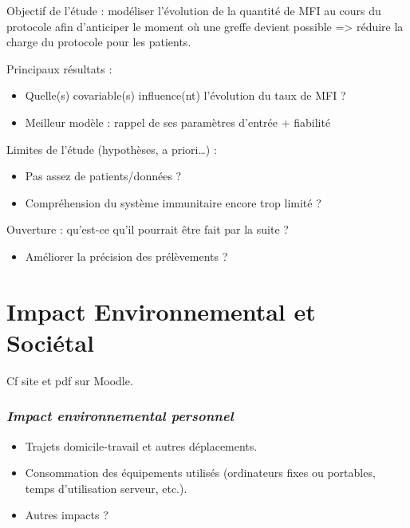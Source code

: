 \documentclass[
]{article}
\providecommand{\tightlist}{%
  \setlength{\itemsep}{0pt}\setlength{\parskip}{0pt}}
\begin{document}
Objectif de l'étude : modéliser l'évolution de la quantité de MFI au
cours du protocole afin d'anticiper le moment où une greffe devient
possible =\textgreater{} réduire la charge du protocole pour les
patients.

Principaux résultats :

\begin{itemize}
\tightlist
\item
  Quelle(s) covariable(s) influence(nt) l'évolution du taux de MFI ?
\item
  Meilleur modèle : rappel de ses paramètres d'entrée + fiabilité
\end{itemize}

Limites de l'étude (hypothèses, a priori\ldots) :

\begin{itemize}
\tightlist
\item
  Pas assez de patients/données ?
\item
  Compréhension du système immunitaire encore trop limité ?
\end{itemize}

Ouverture : qu'est-ce qu'il pourrait être fait par la suite ?

\begin{itemize}
\tightlist
\item
  Améliorer la précision des prélèvements ?
\end{itemize}

\section{\texorpdfstring{\textbf{Impact Environnemental et
Sociétal}}{Impact Environnemental et Sociétal}}\label{impact-environnemental-et-sociuxe9tal}

Cf site et pdf sur Moodle.

\subsubsection{\texorpdfstring{\emph{Impact environnemental
personnel}}{Impact environnemental personnel}}\label{impact-environnemental-personnel}

\begin{itemize}
\tightlist
\item
  Trajets domicile-travail et autres déplacements.
\item
  Consommation des équipements utilisés (ordinateurs fixes ou portables,
  temps d'utilisation serveur, etc.).
\item
  Autres impacts ?
\end{itemize}
\end{document}
